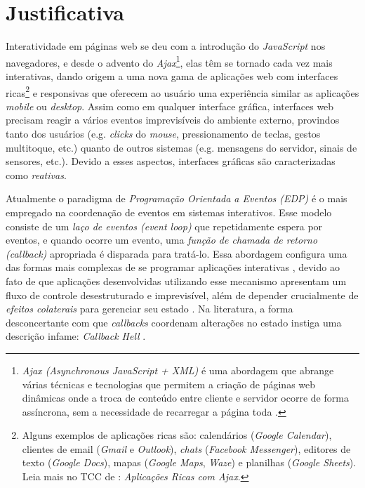\section{Justificativa}\label{ljustificativa}

Interatividade em páginas web se deu com a
introdução do \emph{JavaScript} nos navegadores,
e desde o advento do \emph{Ajax}\footnote{
  \emph{Ajax (Asynchronous JavaScript + XML)} é uma
  abordagem que abrange várias técnicas e
  tecnologias que permitem a criação de páginas web
  dinâmicas onde a troca de conteúdo entre cliente e
  servidor ocorre de forma assíncrona, sem a necessidade
  de recarregar a página toda \cite{garrett2005ajax}.
},
elas têm se tornado cada vez mais interativas,
dando origem a uma nova gama de aplicações web com interfaces
ricas\footnote{
  Alguns exemplos de aplicações ricas são:
  calendários (\emph{Google Calendar}),
  clientes de email (\emph{Gmail} e \emph{Outlook}),
  \emph{chats} (\emph{Facebook Messenger}),
  editores de texto (\emph{Google Docs}),
  mapas (\emph{Google Maps}, \emph{Waze}) e
  planilhas (\emph{Google Sheets}).
  Leia mais no TCC de :
  \emph{Aplicações Ricas com Ajax}.
} e responsivas que oferecem ao usuário uma experiência
similar as aplicações \emph{mobile} ou \emph{desktop}.
Assim como em qualquer interface gráfica, interfaces web
precisam reagir a vários eventos imprevisíveis do ambiente
externo, provindos tanto dos usuários (e.g. \emph{clicks}
do \emph{mouse}, pressionamento de teclas, gestos multitoque,
etc.) quanto de outros sistemas (e.g. mensagens do servidor,
sinais de sensores, etc.).
Devido a esses aspectos, interfaces gráficas são caracterizadas
como \emph{reativas}.

Atualmente o paradigma de \emph{Programação Orientada a Eventos
(EDP)} é o mais empregado na
coordenação de eventos em sistemas interativos.
Esse modelo consiste de um \emph{laço de eventos (event loop)}
que repetidamente espera por eventos, e quando ocorre um
evento, uma \emph{função de chamada de retorno (callback)}
apropriada é disparada para tratá-lo.
Essa abordagem configura uma das formas mais complexas de se
programar aplicações interativas \cite{
  edwards2009coherent,
  fischer2007tasks,
  maier2010deprecating,
  reppy1992higher},
devido ao fato de que aplicações desenvolvidas utilizando
esse mecanismo apresentam um fluxo de controle desestruturado
e imprevisível, além de depender crucialmente de
\emph{efeitos colaterais\footnotemark} para
gerenciar seu estado \cite{
  meyerovich2009flapjax,
  muller2015interactive,
  muller2015practical}.
Na literatura, a forma desconcertante com que \emph{callbacks}
coordenam alterações no estado instiga uma descrição infame:
\emph{Callback Hell} \cite[p.~2]{edwards2009coherent}.


